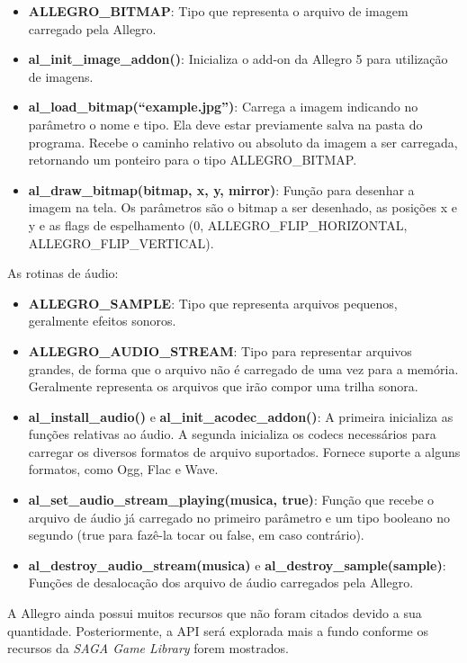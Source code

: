 \begin{itemize}
 \item \textbf{ALLEGRO\_BITMAP}: Tipo que representa o arquivo de imagem carregado pela Allegro.
 \item \textbf{al\_init\_image\_addon()}: Inicializa o add-on da Allegro 5 para utilização de imagens.
 \item \textbf{al\_load\_bitmap(``example.jpg'')}: Carrega a imagem indicando no parâmetro o nome e tipo. Ela deve estar previamente salva na pasta 
 do programa. Recebe o caminho relativo ou absoluto da imagem a ser carregada, retornando um ponteiro para o tipo ALLEGRO\_BITMAP.
 \item \textbf{al\_draw\_bitmap(bitmap, x, y, mirror)}: Função para desenhar a imagem na tela. Os parâmetros são o bitmap a ser desenhado, as 
 posições x e y e as flags de espelhamento (0, ALLEGRO\_FLIP\_HORIZONTAL, ALLEGRO\_FLIP\_VERTICAL).
\end{itemize}
% 
As rotinas de áudio:
%
\begin{itemize}
 \item \textbf{ALLEGRO\_SAMPLE}: Tipo que representa arquivos pequenos, geralmente efeitos sonoros.
 \item \textbf{ALLEGRO\_AUDIO\_STREAM}: Tipo para representar arquivos grandes, de forma que o arquivo não é carregado de uma vez para a 
 memória. Geralmente representa os arquivos que irão compor uma trilha sonora.
 \item \textbf{al\_install\_audio()} e \textbf{al\_init\_acodec\_addon()}: A primeira inicializa as funções relativas ao áudio. A segunda inicializa os 
 codecs necessários para carregar os diversos formatos de arquivo suportados. Fornece suporte a alguns formatos, como Ogg, Flac e Wave.
 \item \textbf{al\_set\_audio\_stream\_playing(musica, true)}: Função que recebe o arquivo de áudio já carregado no primeiro parâmetro e um tipo 
 booleano no segundo (true para fazê-la tocar ou false, em caso contrário).
 \item \textbf{al\_destroy\_audio\_stream(musica) } e \textbf{al\_destroy\_sample(sample)}: Funções de desalocação dos arquivo de áudio carregados 
 pela Allegro.
\end{itemize}
%
%
A Allegro ainda possui muitos recursos que não foram citados devido a sua quantidade. Posteriormente, a API será explorada mais a fundo conforme os recursos da \textit{SAGA Game Library} forem mostrados.
%
%
